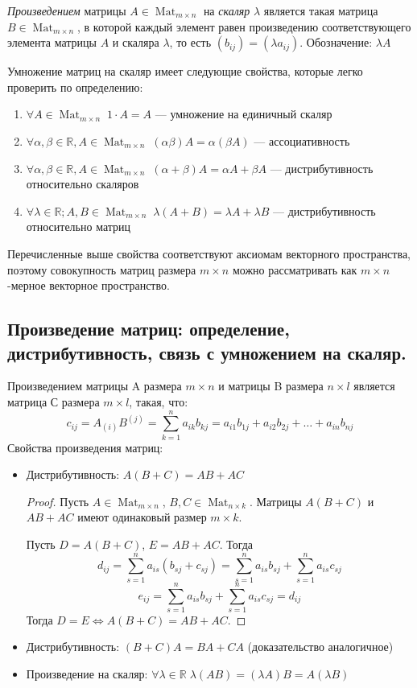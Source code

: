 \documentclass[a4paper, 12pt]{article}
\DeclareMathOperator{\Mat}{Mat}
\newcommand{\bbR}[0]{\mathbb{R}}
\begin{document}
\textit{Произведением} матрицы $A \in \Mat_{m \times n}$ на \textit{скаляр} $\lambda$ является такая матрица $B \in \Mat_{m \times n}$, в которой каждый элемент равен произведению соответствующего элемента матрицы $A$ и скаляра $\lambda$, то есть $(b_{ij}) = (\lambda a_{ij})$. Обозначение: $\lambda A$

Умножение матриц на скаляр имеет следующие свойства, которые легко проверить по определению:
\begin{enumerate}
\item $\forall A\in \Mat_{m \times n}\; 1 \cdot A = A$ --- умножение на единичный скаляр
\item $\forall \alpha, \beta \in \bbR, A\in \Mat_{m \times n}\;(\alpha\beta) A = \alpha(\beta A)$ --- ассоциативность
\item $\forall \alpha, \beta \in \bbR, A\in \Mat_{m \times n}\;(\alpha + \beta)A = \alpha A + \beta A$ --- дистрибутивность относительно скаляров
\item $\forall \lambda \in \bbR; A, B\in \Mat_{m \times n}\;\lambda (A + B) = \lambda A + \lambda B$ --- дистрибутивность относительно матриц
\end{enumerate}

Перечисленные выше свойства соответствуют аксиомам векторного пространства, поэтому совокупность матриц размера $m \times n$ можно рассматривать как $m \times n$-мерное векторное пространство.

\subsection{Произведение матриц: определение, дистрибутивность, связь с умножением на скаляр.}
$\textit{Произведением}$ матрицы A размера $m \times n$ и матрицы B размера $n \times l$ является матрица С размера $m \times l$, такая, что:
\[c_{ij} = A_{(i)} B^{(j)} = \sum\limits_{k = 1}^{n} a_{ik}b_{kj} = a_{i1} b_{1j} + a_{i2} b_{2j} + \ldots + a_{in} b_{nj}\]
Свойства произведения матриц: 
\begin{itemize}
\item Дистрибутивность: $A(B + C) = AB + AC$
\begin{proof}
Пусть $A \in \Mat_{m \times n}$, $B, C \in \Mat_{n \times k}$. Матрицы $A(B + C)$ и $AB + AC$ имеют одинаковый размер $m \times k$.

Пусть $D = A(B + C)$, $E = AB + AC$. Тогда
\[d_{ij}=\sum\limits_{s = 1}^{n} a_{is}(b_{sj} + c_{sj})= \sum\limits_{s=1}^{n} a_{is}b_{sj} + \sum\limits_{s = 1}^{n} a_{is}c_{sj}\]
\[e_{ij} = \sum\limits_{s = 1}^{n} a_{is}b_{sj} + \sum\limits_{s = 1}^{n} a_{is}c_{sj} = d_{ij}\]
Тогда $D = E \iff A(B + C) = AB + AC$.
\end{proof}

\item Дистрибутивность: $(B + C)A = BA + CA$ (доказательство аналогичное)

\item Произведение на скаляр: $\forall \lambda \in \mathbb{R}\; \lambda (AB) = (\lambda A)B = A(\lambda B)$
\end{itemize}
\end{document}
